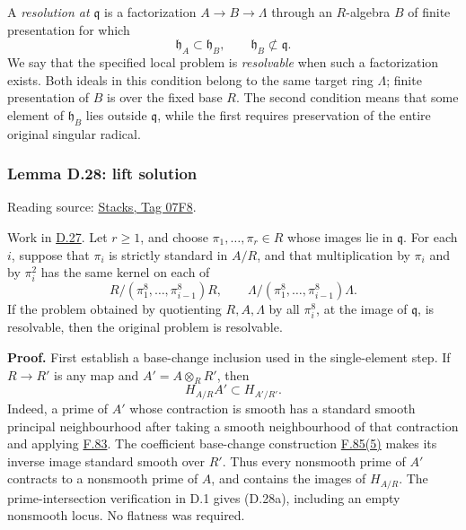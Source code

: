 \documentclass[11pt,a4paper,openany]{report}
\begin{document}
A \emph{resolution at \(\mathfrak q\)} is a factorization \(A\to B\to\Lambda\) through an \(R\)-algebra \(B\) of finite presentation for which \[
\mathfrak h_A\subset\mathfrak h_B,
\qquad \mathfrak h_B\not\subset\mathfrak q.
\] We say that the specified local problem is \emph{resolvable} when such a factorization exists. Both ideals in this condition belong to the same target ring \(\Lambda\); finite presentation of \(B\) is over the fixed base \(R\). The second condition means that some element of \(\mathfrak h_B\) lies outside \(\mathfrak q\), while the first requires preservation of the entire original singular radical.

\label{AG-RG-S05-smoothing-lemma-lift-solution}

\subsubsection{Lemma D.28: lift solution}\label{AG-RG-S05-lemma-d.28-lift-solution}

Reading source: \href{https://stacks.math.columbia.edu/tag/07F8}{Stacks, Tag 07F8}.

Work in \hyperref[AG-RG-S05-smoothing-situation-local]{D.27}. Let \(r\ge1\), and choose \(\pi_1,\ldots,\pi_r\in R\) whose images lie in \(\mathfrak q\). For each \(i\), suppose that \(\pi_i\) is strictly standard in \(A/R\), and that multiplication by \(\pi_i\) and by \(\pi_i^2\) has the same kernel on each of \[
R/(\pi_1^8,\ldots,\pi_{i-1}^8)R,
\qquad
\Lambda/(\pi_1^8,\ldots,\pi_{i-1}^8)\Lambda.
\] If the problem obtained by quotienting \(R,A,\Lambda\) by all \(\pi_i^8\), at the image of \(\mathfrak q\), is resolvable, then the original problem is resolvable.

\textbf{Proof.} First establish a base-change inclusion used in the single-element step. If \(R\to R'\) is any map and \(A'=A\otimes_R R'\), then \[
H_{A/R}A'\subset H_{A'/R'}.
\tag{D.28a}
\] Indeed, a prime of \(A'\) whose contraction is smooth has a standard smooth principal neighbourhood after taking a smooth neighbourhood of that contraction and applying \hyperref[AG-RG-S05-algebra-lemma-smooth-syntomic]{F.83}. The coefficient base-change construction \hyperref[AG-RG-S05-algebra-lemma-standard-smooth]{F.85(5)} makes its inverse image standard smooth over \(R'\). Thus every nonsmooth prime of \(A'\) contracts to a nonsmooth prime of \(A\), and contains the images of \(H_{A/R}\). The prime-intersection verification in D.1 gives (D.28a), including an empty nonsmooth locus. No flatness was required.
\end{document}
